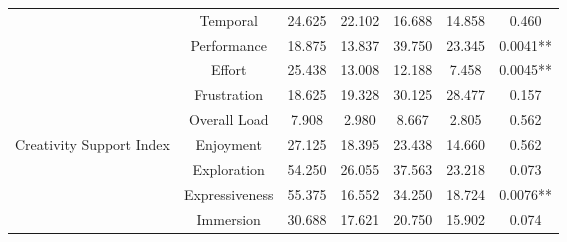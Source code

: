 \begin{table*}[!htbp]
{\begin{tabular}{ccccccc}
\multicolumn{1}{c|}{}                                                & \multicolumn{1}{c|}{Temporal}             & \multicolumn{1}{c|}{24.625} & \multicolumn{1}{c|}{22.102} & \multicolumn{1}{c|}{16.688} & \multicolumn{1}{c|}{14.858} & 0.460              \\ \cline{2-7} 
\multicolumn{1}{c|}{}                                                & \multicolumn{1}{c|}{Performance}          & \multicolumn{1}{c|}{18.875} & \multicolumn{1}{c|}{13.837} & \multicolumn{1}{c|}{39.750} & \multicolumn{1}{c|}{23.345} & 0.0041**           \\ \cline{2-7} 
\multicolumn{1}{c|}{}                                                & \multicolumn{1}{c|}{Effort}               & \multicolumn{1}{c|}{25.438} & \multicolumn{1}{c|}{13.008} & \multicolumn{1}{c|}{12.188} & \multicolumn{1}{c|}{7.458}  & 0.0045**           \\ \cline{2-7} 
\multicolumn{1}{c|}{}                                                & \multicolumn{1}{c|}{Frustration}          & \multicolumn{1}{c|}{18.625} & \multicolumn{1}{c|}{19.328} & \multicolumn{1}{c|}{30.125} & \multicolumn{1}{c|}{28.477} & 0.157              \\ \cline{2-7} 
\multicolumn{1}{c|}{}                                                & \multicolumn{1}{c|}{Overall Load}         & \multicolumn{1}{c|}{7.908}  & \multicolumn{1}{c|}{2.980}  & \multicolumn{1}{c|}{8.667}  & \multicolumn{1}{c|}{2.805}  & 0.562              \\ \hline
\multicolumn{1}{c|}{\multirow{6}{*}{Creativity Support Index}}       & \multicolumn{1}{c|}{Enjoyment}            & \multicolumn{1}{c|}{27.125} & \multicolumn{1}{c|}{18.395} & \multicolumn{1}{c|}{23.438} & \multicolumn{1}{c|}{14.660} & 0.562              \\ \cline{2-7} 
\multicolumn{1}{c|}{}                                                & \multicolumn{1}{c|}{Exploration}          & \multicolumn{1}{c|}{54.250} & \multicolumn{1}{c|}{26.055} & \multicolumn{1}{c|}{37.563} & \multicolumn{1}{c|}{23.218} & 0.073              \\ \cline{2-7} 
\multicolumn{1}{c|}{}                                                & \multicolumn{1}{c|}{Expressiveness}       & \multicolumn{1}{c|}{55.375} & \multicolumn{1}{c|}{16.552} & \multicolumn{1}{c|}{34.250} & \multicolumn{1}{c|}{18.724} & 0.0076**            \\ \cline{2-7} 
\multicolumn{1}{c|}{}                                                & \multicolumn{1}{c|}{Immersion}            & \multicolumn{1}{c|}{30.688} & \multicolumn{1}{c|}{17.621} & \multicolumn{1}{c|}{20.750} & \multicolumn{1}{c|}{15.902} & 0.074              \\ \cline{2-7} 

\end{tabular}}
\end{table*}
